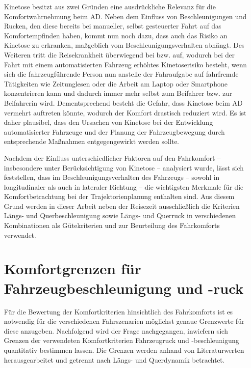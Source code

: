 Kinetose besitzt aus zwei Gründen eine ausdrückliche Relevanz für die Komfortwahrnehmung beim \gls{AD}. Neben dem Einfluss von Beschleunigungen und Rucken, den diese bereits bei manueller, selbst gesteuerter Fahrt auf das Komfortempfinden haben, kommt nun noch dazu, dass auch das Risiko an Kinetose zu erkranken, maßgeblich vom Beschleunigungsverhalten abhängt. Des Weiteren tritt die Reisekrankheit überwiegend bei  bzw.  auf, wodurch bei der Fahrt mit einem automatisierten Fahrzeug erhöhtes Kinetoserisiko besteht, wenn sich die fahrzeugführende Person nun anstelle der Fahraufgabe auf fahrfremde Tätigkeiten wie Zeitunglesen oder die Arbeit am Laptop oder Smartphone konzentrieren kann und dadurch immer mehr selbst zum Beifahrer bzw. zur Beifahrerin wird. Dementsprechend besteht die Gefahr, dass Kinetose beim \gls{AD} vermehrt auftreten könnte, wodurch der Komfort drastisch reduziert wird. Es ist daher plausibel, dass den Ursachen von Kinetose bei der Entwicklung automatisierter Fahrzeuge und der Planung der Fahrzeugbewegung durch entsprechende Maßnahmen entgegengewirkt werden sollte. 

Nachdem der Einfluss unterschiedlicher Faktoren auf den Fahrkomfort -- insbesondere unter Berücksichtigung von Kinetose -- analysiert wurde, lässt sich feststellen, dass im Beschleunigungsverhalten des Fahrzeugs -- sowohl in longitudinaler als auch in lateraler Richtung -- die wichtigsten Merkmale für die Komfortbetrachtung bei der Trajektorienplanung enthalten sind. Aus diesem Grund werden in dieser Arbeit neben der Reisezeit ausschließlich die Kriterien Längs- und Querbeschleunigung sowie Längs- und Querruck in verschiedenen Kombinationen als Gütekriterien und zur Beurteilung des Fahrkomforts verwendet. 

\section{Komfortgrenzen für Fahrzeugbeschleunigung und -ruck} \label{sec:komfortgrenzen}
Für die Bewertung der Komfortkriterien hinsichtlich des Fahrkomforts ist es notwendig für die verschiedenen Fahrszenarien möglichst genaue Grenzwerte für diese anzugeben. Nachfolgend wird der Frage nachgegangen, inwiefern sich Grenzen der verwendeten Komfortkriterien Fahrzeugruck und -beschleunigung quantitativ bestimmen lassen. Die Grenzen werden anhand von Literaturwerten herausgearbeitet und getrennt nach Längs- und Querdynamik betrachtet.

